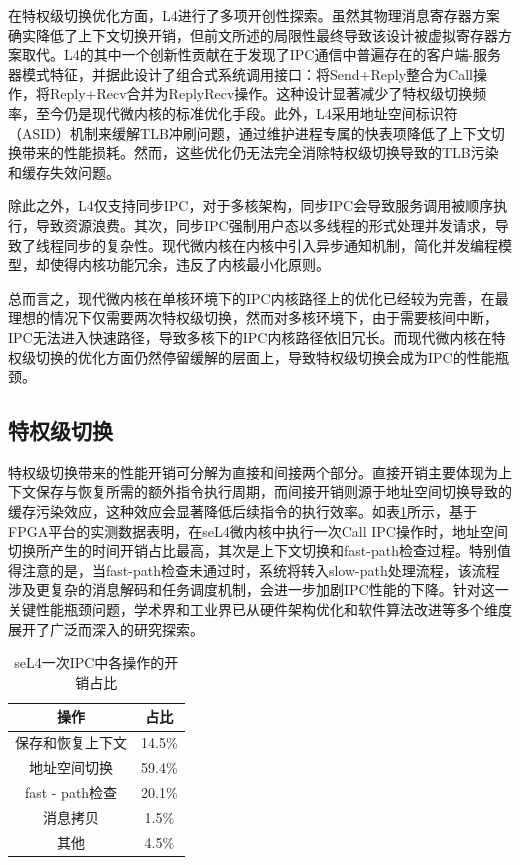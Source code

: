 在特权级切换优化方面，L4进行了多项开创性探索。虽然其物理消息寄存器方案确实降低了上下文切换开销，但前文所述的局限性最终导致该设计被虚拟寄存器方案取代\cite{heiser2016l4}。L4的其中一个创新性贡献在于发现了IPC通信中普遍存在的客户端-服务器模式特征，并据此设计了组合式系统调用接口：将Send+Reply整合为Call操作，将Reply+Recv合并为ReplyRecv操作。这种设计显著减少了特权级切换频率，至今仍是现代微内核的标准优化手段。此外，L4采用地址空间标识符（ASID）机制来缓解TLB冲刷问题\cite{arm2009asid}，通过维护进程专属的快表项降低了上下文切换带来的性能损耗。然而，这些优化仍无法完全消除特权级切换导致的TLB污染和缓存失效问题\cite{cox2017efficient}。

除此之外，L4仅支持同步IPC，对于多核架构，同步IPC会导致服务调用被顺序执行，导致资源浪费\cite{kuang2013towards}。其次，同步IPC强制用户态以多线程的形式处理并发请求，导致了线程同步的复杂性。现代微内核在内核中引入异步通知机制，简化并发编程模型，却使得内核功能冗余，违反了内核最小化原则。

总而言之，现代微内核在单核环境下的IPC内核路径上的优化已经较为完善，在最理想的情况下仅需要两次特权级切换，然而对多核环境下，由于需要核间中断，IPC无法进入快速路径，导致多核下的IPC内核路径依旧冗长。而现代微内核在特权级切换的优化方面仍然停留缓解的层面上，导致特权级切换会成为IPC的性能瓶颈。

\subsection{特权级切换}
特权级切换带来的性能开销可分解为直接和间接两个部分\cite{li2007quantifying}。直接开销主要体现为上下文保存与恢复所需的额外指令执行周期，而间接开销则源于地址空间切换导致的缓存污染效应\cite{gotzfried2017cache}，这种效应会显著降低后续指令的执行效率。如表\ref{tab:seL4_call_cost}所示，基于FPGA平台的实测数据表明，在seL4微内核中执行一次Call IPC操作时，地址空间切换所产生的时间开销占比最高，其次是上下文切换和fast-path检查过程。特别值得注意的是，当fast-path检查未通过时，系统将转入slow-path处理流程，该流程涉及更复杂的消息解码和任务调度机制，会进一步加剧IPC性能的下降。针对这一关键性能瓶颈问题，学术界和工业界已从硬件架构优化和软件算法改进等多个维度展开了广泛而深入的研究探索。
\begin{table}
    \centering
    \caption{seL4一次IPC中各操作的开销占比}
    \begin{tabular}{|c|c|}
        \hline 
        操作 & 占比 \\
        \hline
        保存和恢复上下文 & 14.5\% \\
        \hline
        地址空间切换 & 59.4\% \\
        \hline
        fast - path检查 & 20.1\% \\
        \hline
        消息拷贝 & 1.5\% \\
        \hline
        其他 & 4.5\% \\
        \hline
    \end{tabular}
    \label{tab:seL4_call_cost}
\end{table}
    
